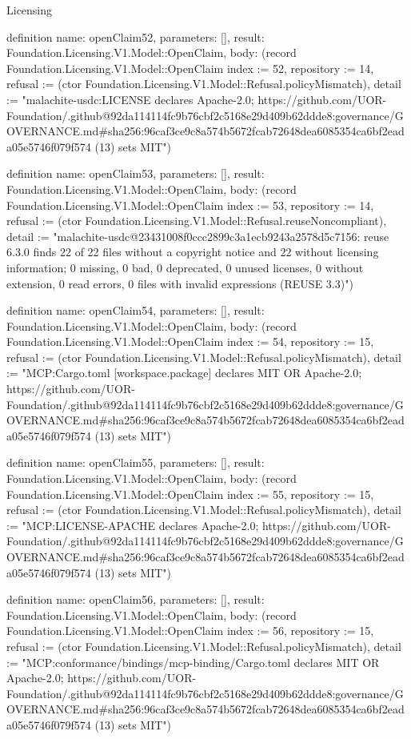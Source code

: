 \begin{lexlean}{Licensing}
\begin{semanticmodule}
definition{
  name: openClaim52,
  parameters: [],
  result: Foundation.Licensing.V1.Model::OpenClaim,
  body: (record Foundation.Licensing.V1.Model::OpenClaim {index := 52, repository := 14, refusal := (ctor Foundation.Licensing.V1.Model::Refusal.policyMismatch), detail := "malachite-usdc:LICENSE declares Apache-2.0; https://github.com/UOR-Foundation/.github@92da114114fc9b76cbf2c5168e29d409b62ddde8:governance/GOVERNANCE.md#sha256:96caf3ce9c8a574b5672fcab72648dea6085354ca6bf2eada05e5746f079f574 (13) sets MIT"})
}

definition{
  name: openClaim53,
  parameters: [],
  result: Foundation.Licensing.V1.Model::OpenClaim,
  body: (record Foundation.Licensing.V1.Model::OpenClaim {index := 53, repository := 14, refusal := (ctor Foundation.Licensing.V1.Model::Refusal.reuseNoncompliant), detail := "malachite-usdc@23431008f0ccc2899c3a1ecb9243a2578d5c7156: reuse 6.3.0 finds 22 of 22 files without a copyright notice and 22 without licensing information; 0 missing, 0 bad, 0 deprecated, 0 unused licenses, 0 without extension, 0 read errors, 0 files with invalid expressions (REUSE 3.3)"})
}

definition{
  name: openClaim54,
  parameters: [],
  result: Foundation.Licensing.V1.Model::OpenClaim,
  body: (record Foundation.Licensing.V1.Model::OpenClaim {index := 54, repository := 15, refusal := (ctor Foundation.Licensing.V1.Model::Refusal.policyMismatch), detail := "MCP:Cargo.toml [workspace.package] declares MIT OR Apache-2.0; https://github.com/UOR-Foundation/.github@92da114114fc9b76cbf2c5168e29d409b62ddde8:governance/GOVERNANCE.md#sha256:96caf3ce9c8a574b5672fcab72648dea6085354ca6bf2eada05e5746f079f574 (13) sets MIT"})
}

definition{
  name: openClaim55,
  parameters: [],
  result: Foundation.Licensing.V1.Model::OpenClaim,
  body: (record Foundation.Licensing.V1.Model::OpenClaim {index := 55, repository := 15, refusal := (ctor Foundation.Licensing.V1.Model::Refusal.policyMismatch), detail := "MCP:LICENSE-APACHE declares Apache-2.0; https://github.com/UOR-Foundation/.github@92da114114fc9b76cbf2c5168e29d409b62ddde8:governance/GOVERNANCE.md#sha256:96caf3ce9c8a574b5672fcab72648dea6085354ca6bf2eada05e5746f079f574 (13) sets MIT"})
}

definition{
  name: openClaim56,
  parameters: [],
  result: Foundation.Licensing.V1.Model::OpenClaim,
  body: (record Foundation.Licensing.V1.Model::OpenClaim {index := 56, repository := 15, refusal := (ctor Foundation.Licensing.V1.Model::Refusal.policyMismatch), detail := "MCP:conformance/bindings/mcp-binding/Cargo.toml declares MIT OR Apache-2.0; https://github.com/UOR-Foundation/.github@92da114114fc9b76cbf2c5168e29d409b62ddde8:governance/GOVERNANCE.md#sha256:96caf3ce9c8a574b5672fcab72648dea6085354ca6bf2eada05e5746f079f574 (13) sets MIT"})
}


\end{semanticmodule}
\end{lexlean}
